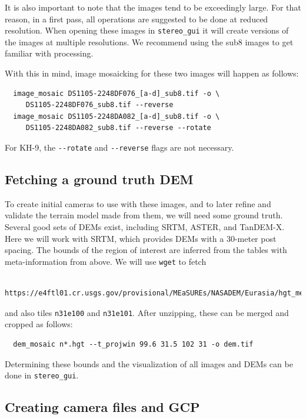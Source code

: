 It is also important to note that the images tend to be exceedingly large. For
that reason, in a first pass, all operations are suggested to be done
at reduced resolution. When opening these images in \texttt{stereo\_gui}
it will create versions of the images at multiple resolutions. We recommend
using the sub8 images to get familiar with processing. 

With this in mind, image mosaicking for these two images will happen as follows:

\begin{verbatim}
  image_mosaic DS1105-2248DF076_[a-d]_sub8.tif -o \
     DS1105-2248DF076_sub8.tif --reverse
  image_mosaic DS1105-2248DA082_[a-d]_sub8.tif -o \
     DS1105-2248DA082_sub8.tif --reverse --rotate
\end{verbatim}

For KH-9, the \texttt{-\/-rotate} and \texttt{-\/-reverse} flags are not
necessary.

\subsection{Fetching a ground truth DEM}

To create initial cameras to use with these images, and to later refine and validate
the terrain model made from them, we will need some ground truth. 
Several good sets of DEMs exist, including SRTM, ASTER, and TanDEM-X. Here we will
work with SRTM, which provides DEMs with a 30-meter post spacing. The bounds of the region 
of interest are inferred from the tables with meta-information from above. 
We will use \texttt{wget} to fetch

\begin{verbatim}
   https://e4ftl01.cr.usgs.gov/provisional/MEaSUREs/NASADEM/Eurasia/hgt_merge/n31e099.hgt.zip
\end{verbatim}

and also tiles \texttt{n31e100} and \texttt{n31e101}. After unzipping, these can be
merged and cropped as follows:

\begin{verbatim}
  dem_mosaic n*.hgt --t_projwin 99.6 31.5 102 31 -o dem.tif
\end{verbatim}

Determining these bounds and the visualization of all images and DEMs
can be done in \texttt{stereo\_gui}.

\subsection{Creating camera files and GCP}

